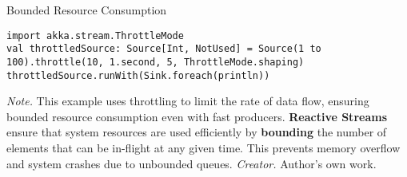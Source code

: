 \begin{table}[H]
\caption{Bounded Resource Consumption}
\begin{lstlisting}
import akka.stream.ThrottleMode
val throttledSource: Source[Int, NotUsed] = Source(1 to 100).throttle(10, 1.second, 5, ThrottleMode.shaping)
throttledSource.runWith(Sink.foreach(println))
\end{lstlisting}
\small
\textit{Note.} This example uses throttling to limit the rate of data flow, ensuring bounded resource consumption even with fast producers. \textbf{Reactive Streams} ensure that system resources are used efficiently by \textbf{bounding} the number of elements that can be in-flight at any given time. This prevents memory overflow and system crashes due to unbounded queues.
\textit{Creator.} Author's own work.
\end{table}
